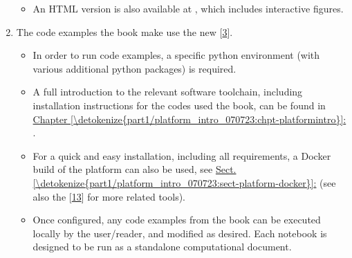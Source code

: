 \documentclass[letterpaper,table,10pt,english]{jupyterBook}
\begin{document}
\begin{enumerate}
\begin{itemize}
\item {} 
\sphinxAtStartPar
An HTML version is also available at , which includes interactive figures.

\end{itemize}

\item {} 
\sphinxAtStartPar
The code examples  the book make use the new  {[}\hyperlink{cite.backmatter/bibliography:id668}{3}{]}.
\begin{itemize}
\item {} 
\sphinxAtStartPar
In order to run code examples, a specific python environment (with various additional python packages) is required.

\item {} 
\sphinxAtStartPar
A full introduction to the relevant software tool\sphinxhyphen{}chain, including installation instructions for the codes used  the book, can be found in \hyperref[\detokenize{part1/platform_intro_070723:chpt-platformintro}]{Chapter \ref{\detokenize{part1/platform_intro_070723:chpt-platformintro}}:} {\hyperref[\detokenize{part1/platform_intro_070723:chpt-platformintro}]{}}.

\item {} 
\sphinxAtStartPar
For a quick and easy installation, including all requirements, a Docker build  of the platform can also be used, see \hyperref[\detokenize{part1/platform_intro_070723:sect-platform-docker}]{Sect.\@ \ref{\detokenize{part1/platform_intro_070723:sect-platform-docker}}:} {\hyperref[\detokenize{part1/platform_intro_070723:sect-platform-docker}]{}} (see also the  {[}\hyperlink{cite.backmatter/bibliography:id671}{13}{]} for more related tools).

\item {} 
\sphinxAtStartPar
Once configured, any code examples from the book can be executed locally by the user/reader, and modified as desired. Each notebook is designed to be run as a stand\sphinxhyphen{}alone computational document.


\end{itemize}
\end{enumerate}
\end{document}
